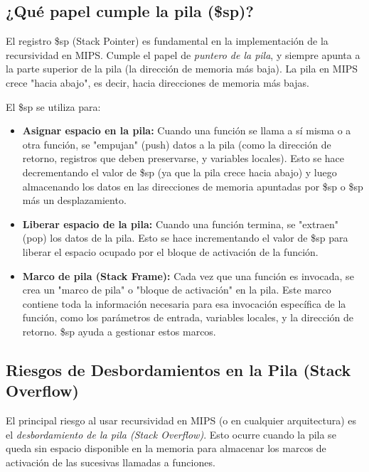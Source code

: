 \documentclass{article}
\begin{document}
\subsection*{¿Qué papel cumple la pila (\$sp)?}

El registro \$sp (Stack Pointer) es fundamental en la implementación de la recursividad en MIPS. Cumple el papel de \textit{puntero de la pila}, y siempre apunta a la parte superior de la pila (la dirección de memoria más baja). La pila en MIPS crece "hacia abajo", es decir, hacia direcciones de memoria más bajas.

El \$sp se utiliza para:
\begin{itemize}
    \item \textbf{Asignar espacio en la pila:} Cuando una función se llama a sí misma o a otra función, se "empujan" (push) datos a la pila (como la dirección de retorno, registros que deben preservarse, y variables locales). Esto se hace decrementando el valor de \$sp (ya que la pila crece hacia abajo) y luego almacenando los datos en las direcciones de memoria apuntadas por \$sp o \$sp más un desplazamiento.
    \item \textbf{Liberar espacio de la pila:} Cuando una función termina, se "extraen" (pop) los datos de la pila. Esto se hace incrementando el valor de \$sp para liberar el espacio ocupado por el bloque de activación de la función.
    \item \textbf{Marco de pila (Stack Frame):} Cada vez que una función es invocada, se crea un "marco de pila" o "bloque de activación" en la pila. Este marco contiene toda la información necesaria para esa invocación específica de la función, como los parámetros de entrada, variables locales, y la dirección de retorno. \$sp ayuda a gestionar estos marcos.
\end{itemize}

\subsection*{Riesgos de Desbordamientos en la Pila (Stack Overflow)}

El principal riesgo al usar recursividad en MIPS (o en cualquier arquitectura) es el \textit{desbordamiento de la pila (Stack Overflow)}. Esto ocurre cuando la pila se queda sin espacio disponible en la memoria para almacenar los marcos de activación de las sucesivas llamadas a funciones.
\end{document}
